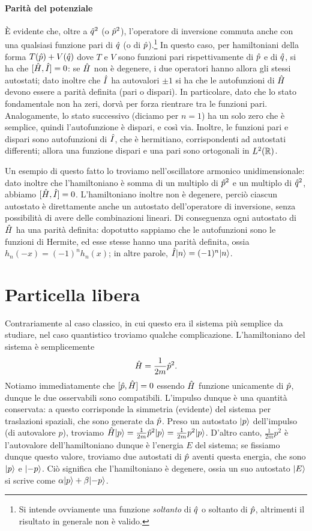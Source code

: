 \paragraph{Parità del potenziale}
È evidente che, oltre a $\op q^2$ (o $\op p^2$), l'operatore di inversione commuta anche con una qualsiasi funzione pari di $\op q$ (o di $\op p$).\footnote{Si intende ovviamente una funzione \emph{soltanto} di $\op q$ o soltanto di $\op p$, altrimenti il risultato in generale non è valido.}
In questo caso, per hamiltoniani della forma $T(\op p)+V(\op q)$ dove $T$ e $V$ sono funzioni pari rispettivamente di $\op p$ e di $\op q$, si ha che $[\op H,\op I]=0$: se $\op H$ non è degenere, i due operatori hanno allora gli stessi autostati; dato inoltre che $\op I$ ha autovalori $\pm 1$ si ha che le autofunzioni di $\op H$ devono essere a parità definita (pari o dispari).
In particolare, dato che lo stato fondamentale non ha zeri, dorvà per forza rientrare tra le funzioni pari.
Analogamente, lo stato successivo (diciamo per $n=1$) ha un solo zero che è semplice, quindi l'autofunzione è dispari, e cos\`i via.
Inoltre, le funzioni pari e dispari sono autofunzioni di $\op I$, che è hermitiano, corrispondenti ad autostati differenti; allora una funzione dispari e una pari sono ortogonali in $\leb[2]{\R}$.

Un esempio di questo fatto lo troviamo nell'oscillatore armonico unidimensionale: dato inoltre che l'hamiltoniano è somma di un multiplo di $\op p^2$ e un multiplo di $\op q^2$, abbiamo $[\op H,\op I]=0$.
L'hamiltoniano inoltre non è degenere, perciò ciascun autostato è direttamente anche un autostato dell'operatore di inversione, senza possibilità di avere delle combinazioni lineari.
Di conseguenza ogni autostato di $\op H$ ha una parità definita: dopotutto sappiamo che le autofunzioni sono le funzioni di Hermite, ed esse stesse hanno una parità definita, ossia $h_n(-x)=(-1)^nh_n(x)$; in altre parole, $\op I\ket{n}=(-1)^n\ket{n}$.

\section{Particella libera}
Contrariamente al caso classico, in cui questo era il sistema più semplice da studiare, nel caso quantistico troviamo qualche complicazione.
L'hamiltoniano del sistema è semplicemente
\begin{equation}
	\op H=\frac1{2m}\op p^2.
	\label{eq:H-particella-libera}
\end{equation}
Notiamo immediatamente che $[\op p,\op H]=0$ essendo $\op H$ funzione unicamente di $\op p$, dunque le due osservabili sono compatibili.
L'impulso dunque è una quantità conservata: a questo corrisponde la simmetria (evidente) del sistema per traslazioni spaziali, che sono generate da $\op p$.
Preso un autostato $\ket{p}$ dell'impulso (di autovalore $p$), troviamo $\op H\ket{p}=\frac1{2m}\op p^2\ket{p}=\frac1{2m}p^2\ket{p}$.
D'altro canto, $\frac1{2m}p^2$ è l'autovalore dell'hamiltoniano dunque è l'energia $E$ del sistema; se fissiamo dunque questo valore, troviamo due autostati di $\op p$ aventi questa energia, che sono $\ket{p}$ e $\ket{-p}$.
Ciò significa che l'hamiltoniano è degenere, ossia un suo autostato $\ket{E}$ si scrive come $\alpha\ket{p}+\beta\ket{-p}$.

